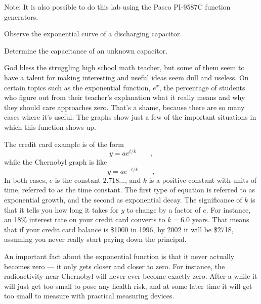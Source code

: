 \label{lab:rc}

\apparatus
{}

Note: It is also possible to do this lab using the Pasco PI-9587C function
generators.

\begin{goals}

\item[] Observe the exponential curve of a discharging capacitor.

\item[] Determine the capacitance of an unknown capacitor.
\end{goals}

\introduction

God bless the struggling high school math teacher, but some
of them seem to have a talent for making interesting and
useful ideas seem dull and useless. On certain topics such
as the exponential function, $e^x$, the percentage of students
who figure out from their teacher's explanation what it
really means and why they should care approaches zero.
That's a shame, because there are so many cases where it's
useful. The graphs show just a few of the important
situations in which this function shows up.


The credit card example is of the form
\begin{equation*}
    y=ae^{t/k}   \qquad   ,
\end{equation*}
while the Chernobyl graph is like
\begin{equation*}
    y=ae^{-t/k}    \qquad   ,
\end{equation*}
In both cases, $e$ is the constant $2.718\ldots$, and $k$ is a
positive constant with units of time, referred to as the
time constant. The first type of equation is referred to as
exponential growth, and the second as exponential decay. The
significance of $k$ is that it tells you how long it takes
for $y$ to change by a factor of $e$. For instance, an 18\%
interest rate on your credit card converts to $k=6.0$ years.
That means that if your credit card balance is \$1000 in
1996, by 2002 it will be \$2718, assuming you never really
start paying down the principal.

An important fact about the exponential function is that it
never actually becomes zero --- it only gets closer and
closer to zero. For instance, the radioactivity near
Chernobyl will never ever become exactly zero. After a while
it will just get too small to pose any health risk, and at
some later time it will get too small to measure with
practical measuring devices.

